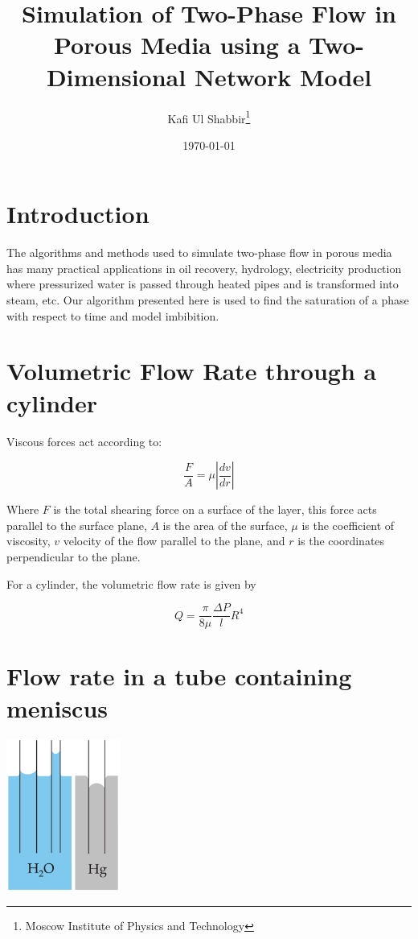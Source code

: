 \documentclass[12pt]{article}
\title{Simulation of Two-Phase Flow in Porous Media using a Two-Dimensional Network Model}
\author{Kafi Ul Shabbir\thanks{Moscow Institute of Physics and Technology}}
\date{\today}
\begin{document}
\maketitle

\section{Introduction}
The algorithms and methods used to simulate two-phase flow in porous media has many practical applications in oil recovery, hydrology, electricity production where pressurized water is passed through heated pipes and is transformed into steam, etc. Our algorithm presented here is used to find the saturation of a phase with respect to time and model imbibition.

\section{Volumetric Flow Rate through a cylinder}

	Viscous forces act according to:

	\[ \frac{F}{A} = \mu \left| \frac{dv}{dr} \right| \]

	Where $F$ is the total shearing force on a surface of the layer, this force acts parallel to the surface plane, $A$ is the area of the surface, $\mu$ is the coefficient of viscosity, $v$ velocity of the flow parallel to the plane, and $r$ is the coordinates perpendicular to the plane.

	For a cylinder, the volumetric flow rate is given by

	\begin{equation} \label{eq:flow-rate}
	\boxed{Q = \frac{\pi}{8\mu}\frac{\Delta P}{l} R^4}
	\end{equation}


\section{Flow rate in a tube containing meniscus}

	\includegraphics[height=5cm]{diagram/fig_capact-of-water} \label{fig_capact-of-water}
\end{document}
